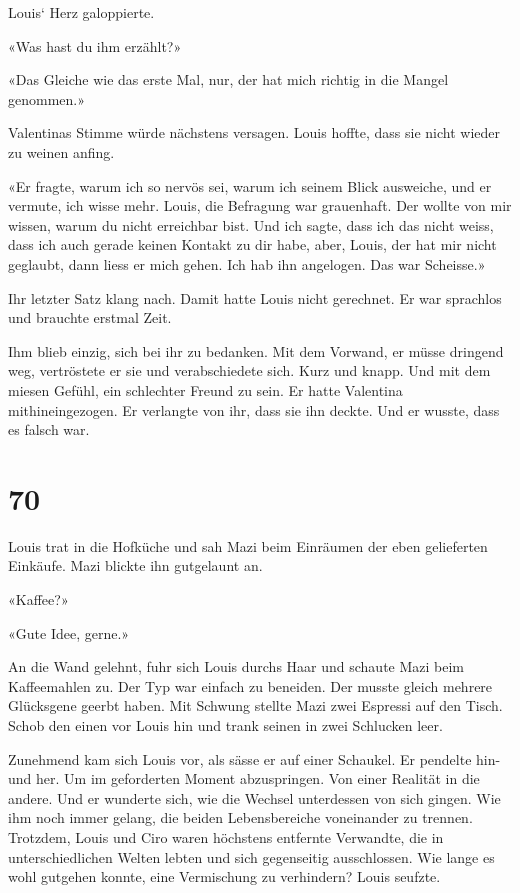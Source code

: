 Louis` Herz galoppierte.

«Was hast du ihm erzählt?»

«Das Gleiche wie das erste Mal, nur, der hat mich richtig in die Mangel
genommen.»

Valentinas Stimme würde nächstens versagen. Louis hoffte, dass sie nicht
wieder zu weinen anfing.

«Er fragte, warum ich so nervös sei, warum ich seinem Blick ausweiche,
und er vermute, ich wisse mehr. Louis, die Befragung war grauenhaft. Der
wollte von mir wissen, warum du nicht erreichbar bist. Und ich sagte,
dass ich das nicht weiss, dass ich auch gerade keinen Kontakt zu dir
habe, aber, Louis, der hat mir nicht geglaubt, dann liess er mich gehen.
Ich hab ihn angelogen. Das war Scheisse.»

Ihr letzter Satz klang nach. Damit hatte Louis nicht gerechnet. Er war
sprachlos und brauchte erstmal Zeit.

Ihm blieb einzig, sich bei ihr zu bedanken. Mit dem Vorwand, er müsse
dringend weg, vertröstete er sie und verabschiedete sich. Kurz und
knapp. Und mit dem miesen Gefühl, ein schlechter Freund zu sein. Er
hatte Valentina mithineingezogen. Er verlangte von ihr, dass sie ihn
deckte. Und er wusste, dass es falsch war.

\chapter{70}\label{section-70}

Louis trat in die Hofküche und sah Mazi beim Einräumen der eben
gelieferten Einkäufe. Mazi blickte ihn gutgelaunt an.

«Kaffee?»

«Gute Idee, gerne.»

An die Wand gelehnt, fuhr sich Louis durchs Haar und schaute Mazi beim
Kaffeemahlen zu. Der Typ war einfach zu beneiden. Der musste gleich
mehrere Glücksgene geerbt haben. Mit Schwung stellte Mazi zwei Espressi
auf den Tisch. Schob den einen vor Louis hin und trank seinen in zwei
Schlucken leer.

Zunehmend kam sich Louis vor, als sässe er auf einer Schaukel. Er
pendelte hin- und her. Um im geforderten Moment abzuspringen. Von einer
Realität in die andere. Und er wunderte sich, wie die Wechsel
unterdessen von sich gingen. Wie ihm noch immer gelang, die beiden
Lebensbereiche voneinander zu trennen. Trotzdem, Louis und Ciro waren
höchstens entfernte Verwandte, die in unterschiedlichen Welten lebten
und sich gegenseitig ausschlossen. Wie lange es wohl gutgehen konnte,
eine Vermischung zu verhindern? Louis seufzte.

